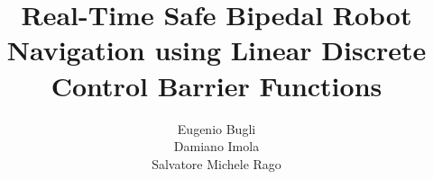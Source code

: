 \documentclass[12pt,a4paper,oneside]{article}
\title{Real-Time Safe Bipedal Robot Navigation using Linear Discrete Control Barrier Functions} %
\author{Eugenio Bugli \\ Damiano Imola \\ Salvatore Michele Rago} %
\theoremstyle{definition}
\begin{document}

\newpage

\tableofcontents
\newpage


\clearpage


\clearpage


\clearpage


\clearpage


\clearpage


\clearpage



\nocite{*}  %
\end{document}
